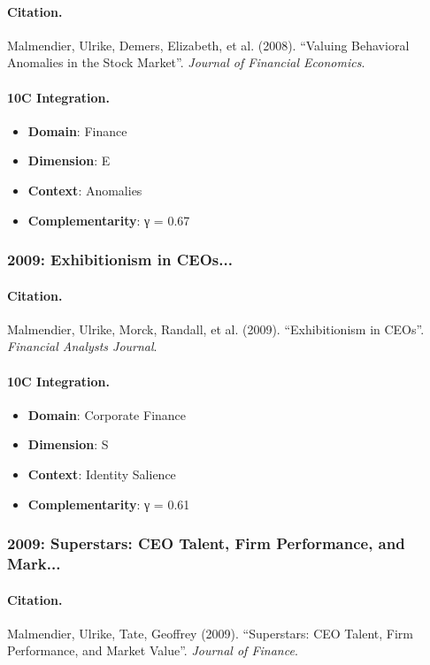 \paragraph{Citation.}
Malmendier, Ulrike, Demers, Elizabeth, et al. (2008). ``Valuing Behavioral Anomalies in the Stock Market''. \textit{Journal of Financial Economics}.

\paragraph{10C Integration.}
\begin{itemize}[nosep]
  \item \textbf{Domain}: Finance
  \item \textbf{Dimension}: E
  \item \textbf{Context}: Anomalies
  \item \textbf{Complementarity}: γ = 0.67
\end{itemize}


\subsubsection{2009: Exhibitionism in CEOs...}

\paragraph{Citation.}
Malmendier, Ulrike, Morck, Randall, et al. (2009). ``Exhibitionism in CEOs''. \textit{Financial Analysts Journal}.

\paragraph{10C Integration.}
\begin{itemize}[nosep]
  \item \textbf{Domain}: Corporate Finance
  \item \textbf{Dimension}: S
  \item \textbf{Context}: Identity Salience
  \item \textbf{Complementarity}: γ = 0.61
\end{itemize}


\subsubsection{2009: Superstars: CEO Talent, Firm Performance, and Mark...}

\paragraph{Citation.}
Malmendier, Ulrike, Tate, Geoffrey (2009). ``Superstars: CEO Talent, Firm Performance, and Market Value''. \textit{Journal of Finance}.

